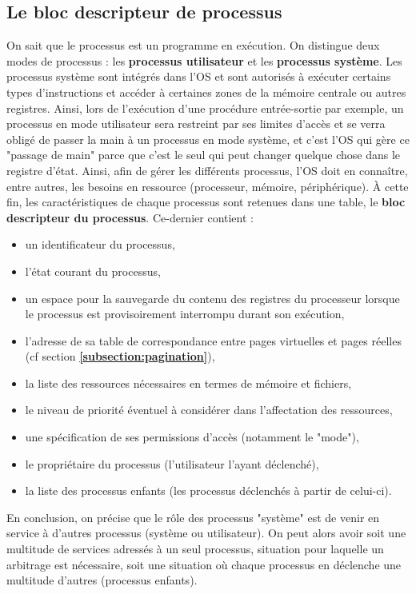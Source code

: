 \documentclass[12pt,a4paper]{report}
\begin{document}
\subsection{Le bloc descripteur de processus}
On sait que le processus est un programme en exécution. On distingue deux modes de processus : les \textbf{processus utilisateur} et les \textbf{processus système}. Les processus système sont intégrés dans l'OS et sont autorisés à exécuter certains types d'instructions et accéder à certaines zones de la mémoire centrale ou autres registres. Ainsi, lors de l'exécution d'une procédure entrée-sortie par exemple, un processus en mode utilisateur sera restreint par ses limites d'accès et se verra obligé de passer la main à un processus en mode système, et c'est l'OS qui gère ce "passage de main" parce que c'est le seul qui peut changer quelque chose dans le registre d'état. Ainsi, afin de gérer les différents processus, l'OS doit en connaître, entre autres, les besoins en ressource (processeur, mémoire, périphérique). À cette fin, les caractéristiques de chaque processus sont retenues dans une table, le \textbf{bloc descripteur du processus}. Ce-dernier contient :
\begin{itemize}
\item un identificateur du processus,
\item l'état courant du processus,
\item un espace pour la sauvegarde du contenu des registres du processeur lorsque le processus est provisoirement interrompu durant son exécution,
\item l'adresse de sa table de correspondance entre pages virtuelles et pages réelles (cf section \textbf{\ref{subsection:pagination}}),
\item la liste des ressources nécessaires en termes de mémoire et fichiers,
\item le niveau de priorité éventuel à considérer dans l'affectation des ressources,
\item une spécification de ses permissions d'accès (notamment le "mode"),
\item le propriétaire du processus (l'utilisateur l'ayant déclenché),
\item la liste des processus enfants (les processus déclenchés à partir de celui-ci).
\end{itemize}
En conclusion, on précise que le rôle des processus "système" est de venir en service à d'autres processus (système ou utilisateur). On peut alors avoir soit une multitude de services adressés à un seul processus, situation pour laquelle un arbitrage est nécessaire, soit une situation où chaque processus en déclenche une multitude d'autres (processus enfants).
\end{document}
